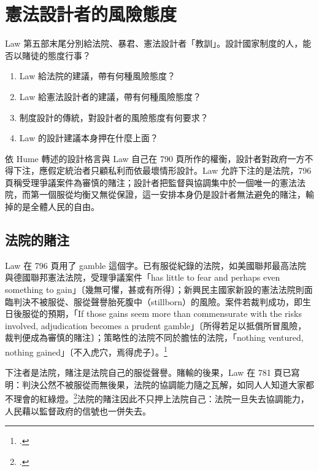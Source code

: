 \chapter{憲法設計者的風險態度}
\label{ch:30_designer}

\begin{qaquestion}
Law 第五部末尾分別給法院、暴君、憲法設計者「教訓」。設計國家制度的人，能否以賭徒的態度行事？
\begin{enumerate}
\tightlist
\item Law 給法院的建議，帶有何種風險態度？
\item Law 給憲法設計者的建議，帶有何種風險態度？
\item 制度設計的傳統，對設計者的風險態度有何要求？
\item Law 的設計建議本身押在什麼上面？
\end{enumerate}
\end{qaquestion}

依 Hume 轉述的設計格言與 Law 自己在 790 頁所作的權衡，設計者對政府一方不得下注，應假定統治者只顧私利而依最壞情形設計。Law 允許下注的是法院，796 頁稱受理爭議案件為審慎的賭注；設計者把監督與協調集中於一個唯一的憲法法院，而第一個服從均衡又無從保證，這一安排本身仍是設計者無法避免的賭注，輸掉的是全體人民的自由。

\section{法院的賭注}
\label{sec:30_designer-1}

Law 在 796 頁用了 gamble 這個字。已有服從紀錄的法院，如美國聯邦最高法院與德國聯邦憲法法院，受理爭議案件「has little to fear and perhaps even something to gain」〔幾無可懼，甚或有所得〕；新興民主國家新設的憲法法院則面臨判決不被服從、服從聲譽胎死腹中（stillborn）的風險。案件若裁判成功，即生日後服從的預期，「If those gains seem more than commensurate with the risks involved, adjudication becomes a prudent gamble」〔所得若足以抵償所冒風險，裁判便成為審慎的賭注〕；策略性的法院不同於膽怯的法院，「nothing ventured, nothing gained」〔不入虎穴，焉得虎子〕。\footcite[796]{law2009}

下注者是法院，賭注是法院自己的服從聲譽。賭輸的後果，Law 在 781 頁已寫明：判決公然不被服從而無後果，法院的協調能力隨之瓦解，如同人人知道大家都不理會的紅綠燈。\footcite[781]{law2009}法院的賭注因此不只押上法院自己：法院一旦失去協調能力，人民藉以監督政府的信號也一併失去。

